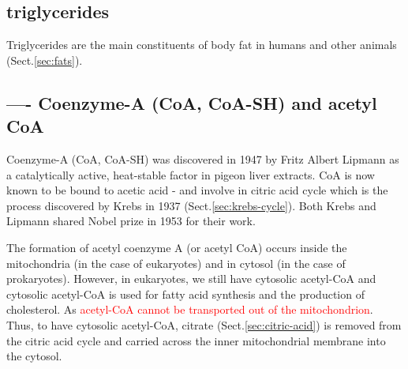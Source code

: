 \subsection{triglycerides}
\label{sec:triglycerides}

Triglycerides are the main constituents of body fat in humans and other animals
(Sect.\ref{sec:fats}).


\subsection{---- Coenzyme-A (CoA, CoA-SH) and acetyl CoA}
\label{sec:CoA}
\label{sec:Acetyl-CoA}
\label{sec:coenzyme-A}

Coenzyme-A (CoA, CoA-SH) was discovered in 1947 by Fritz Albert Lipmann
as a catalytically active, heat-stable factor in pigeon liver extracts.
CoA is now known to be bound to acetic acid - and involve in citric acid cycle
which is the process discovered by Krebs in 1937 (Sect.\ref{sec:krebs-cycle}).
Both Krebs and Lipmann shared Nobel prize in 1953 for their work.

The formation of acetyl coenzyme A (or acetyl CoA) occurs inside the
mitochondria (in the case of eukaryotes) and in cytosol (in the case of
prokaryotes). However, in eukaryotes, we still have cytosolic acetyl-CoA and
cytosolic acetyl-CoA is used for fatty acid synthesis and the production of
cholesterol. As \textcolor{red}{acetyl-CoA cannot be transported out of the
mitochondrion}.
Thus, to have cytosolic acetyl-CoA, citrate (Sect.\ref{sec:citric-acid}) is
removed from the citric acid cycle and carried across the inner mitochondrial
membrane into the cytosol.

